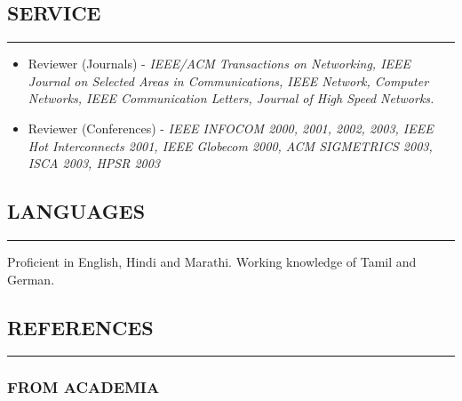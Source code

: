 \documentclass[10pt,a4]{article}
\begin{document}
\begin{small}
\subsection*{SERVICE}
\hrule
\vspace{0.2cm}
\begin{itemize}
	\item Reviewer (Journals) - {\it IEEE/ACM Transactions on Networking,
IEEE Journal on Selected Areas in Communications, IEEE Network, Computer
Networks, IEEE Communication Letters, Journal of High Speed Networks.}
	\item Reviewer (Conferences) - {\it IEEE INFOCOM 2000, 2001, 2002, 2003,
IEEE Hot Interconnects 2001, IEEE Globecom 2000, ACM SIGMETRICS 2003, ISCA 2003,
HPSR 2003}
\end{itemize}


\subsection*{LANGUAGES}
\hrule
\vspace{0.2cm}
\begin{list}{}{}
	\item  Proficient in English, Hindi and Marathi. Working knowledge of Tamil and German.
\end{list}


\vspace{0.1cm}

\subsection*{REFERENCES}
\hrule
\vspace{0.2cm}


\subsubsection*{FROM ACADEMIA}
\begin{footnotesize}


\end{footnotesize}
\end{small}
\end{document}
